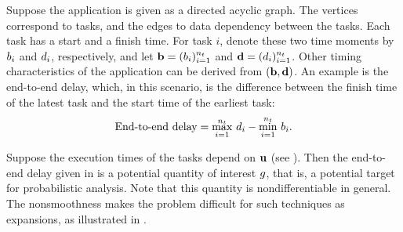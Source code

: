 Suppose the application is given as a directed acyclic graph. The vertices
correspond to tasks, and the edges to data dependency between the tasks. Each
task has a start and a finish time. For task $i$, denote these two time moments
by $b_i$ and $d_i$, respectively, and let $\mathbf{b} = (b_i)_{i=1}^{n_t}$ and $\mathbf{d} =
(d_i)_{i=1}^{n_t}$. Other timing characteristics of the application can be
derived from $(\mathbf{b}, \mathbf{d})$. An example is the end-to-end delay, which, in this
scenario, is the difference between the finish time of the latest task and the
start time of the earliest task:
\begin{equation} \elab{end-to-end-delay}
  \text{End-to-end delay} = \max_{i = 1}^\nt \, \d_i - \min_{i = 1}^\nt \, \b_i.
\end{equation}

Suppose the execution times of the tasks depend on $\mathbf{u}$ (see ).
Then the end-to-end delay given in  is a potential
quantity of interest $g$, that is, a potential target for probabilistic
analysis. Note that this quantity is nondifferentiable in general. The
nonsmoothness makes the problem difficult for such techniques as 
expansions, as illustrated in .
